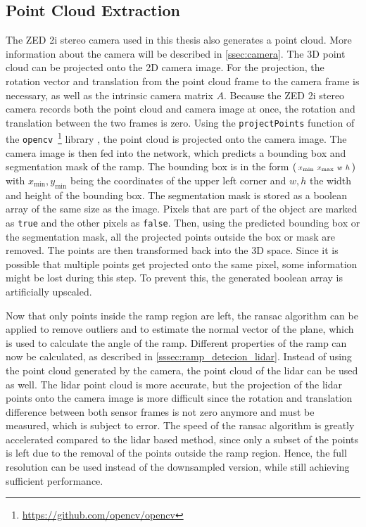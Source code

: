 \subsection{Point Cloud Extraction}
\label{ssec:point_cloud_extraction}
The ZED 2i stereo camera used in this thesis also generates a point cloud.
More information about the camera will be described in \cref{ssec:camera}.
The 3D point cloud can be projected onto the 2D camera image.
For the projection, the rotation vector and translation from the point cloud frame to the camera frame is necessary, as well as the intrinsic camera matrix $A$.
Because the ZED 2i stereo camera records both the point cloud and camera image at once, the rotation and translation between the two frames is zero.
Using the \texttt{projectPoints} function of the \texttt{opencv}~\footnote{\url{https://github.com/opencv/opencv}} library \cite{Bradski2000}, the point cloud is projected onto the camera image.
The camera image is then fed into the network, which predicts a bounding box and segmentation mask of the ramp.
The bounding box is in the form  $\smqty(x_\mathrm{min} & x_\mathrm{max} & w & h)$ with $x_\mathrm{min}, y_\mathrm{min} $ being the coordinates of the upper left corner and $w, h$ the width and height of the bounding box.
The segmentation mask is stored as a boolean array of the same size as the image.
Pixels that are part of the object are marked as \texttt{true} and the other pixels as \texttt{false}.
Then, using the predicted bounding box or the segmentation mask, all the projected points outside the box or mask are removed.
The points are then transformed back into the 3D space.
Since it is possible that multiple points get projected onto the same pixel, some information might be lost during this step.
To prevent this, the generated boolean array is artificially upscaled.\par
Now that only points inside the ramp region are left, the \gls{ransac} algorithm can be applied to remove outliers and to estimate the normal vector of the plane, which is used to calculate the angle of the ramp.
Different properties of the ramp can now be calculated, as described in \cref{sssec:ramp_detecion_lidar}.
Instead of using the point cloud generated by the camera, the point cloud of the \gls{lidar} can be used as well.
The \gls{lidar} point cloud is more accurate, but the projection of the \gls{lidar} points onto the camera image is more difficult since the rotation and translation difference between both sensor frames is not zero anymore and must be measured, which is subject to error.
The speed of the \gls{ransac} algorithm is greatly accelerated compared to the \gls{lidar} based method, since only a subset of the points is left due to the removal of the points outside the ramp region.
Hence, the full resolution can be used instead of the downsampled version, while still achieving sufficient performance.